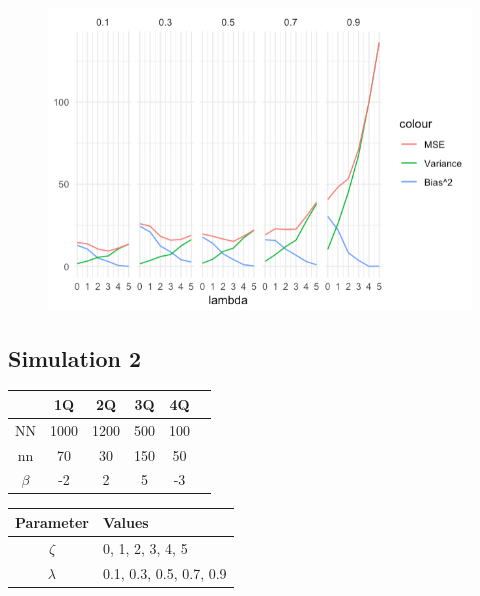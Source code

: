 \documentclass{article}
\begin{document}
\begin{figure}[p]
    \centering
    \includegraphics[width=\textwidth]{img/simulation1.png}
\end{figure}

\pagebreak 
\subsection{Simulation 2}
\begin{table}[!h]
    \begin{tabular}{cccccc}
      \toprule
        & 1Q & 2Q &3Q & 4Q \\
      \midrule
         NN & 1000 & 1200 & 500 & 100 \\
         nn & 70 & 30 & 150 & 50 \\
         $\beta$ & -2 & 2 & 5 & -3 \\
      \bottomrule
      \end{tabular}
      \end{table}

      \begin{table}[h!]
        \begin{tabular}{cl}
          \toprule
           Parameter & Values \\
          \midrule
             $\zeta$ &  0, 1, 2, 3, 4, 5\\
             $\lambda$  & 0.1, 0.3, 0.5, 0.7, 0.9 \\
          \bottomrule
          \end{tabular}
          \end{table}
\end{document}
